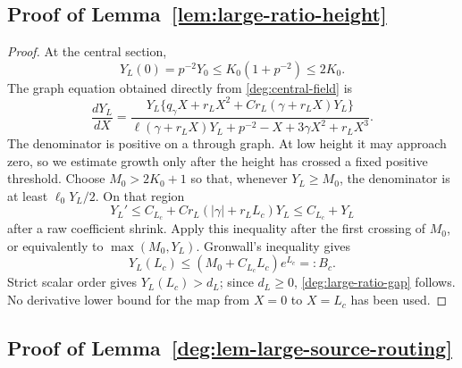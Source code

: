\subsection{Proof of Lemma~\ref{lem:large-ratio-height}}
\label{app:proof-large-ratio-height}

\begin{proof}
At the central section,
\[
 Y_L(0)=p^{-2}Y_0\le K_0(1+p^{-2})\le2K_0.
\]
The graph equation obtained directly from
\eqref{deg:central-field} is
\begin{equation}
 \frac{dY_L}{dX}=
 \frac{Y_L\{q_\gamma X+r_LX^2+
       Cr_L(\gamma+r_LX)Y_L\}}
  {\ell(\gamma+r_LX)Y_L+p^{-2}-X+3\gamma X^2+r_LX^3}.
 \label{eq:large-ratio-graph}
\end{equation}
The denominator is positive on a through graph. At low height it may
approach zero, so we estimate growth only after the height has crossed
a fixed positive threshold.  Choose \(M_0>2K_0+1\) so
that, whenever \(Y_L\ge M_0\), the denominator is at least
\(\ell_0Y_L/2\).  On that region
\[
 Y_L'\le C_{L_c}+Cr_L(|\gamma|+r_LL_c)Y_L
       \le C_{L_c}+Y_L
\]
after a raw coefficient shrink.  Apply this inequality after the first crossing of \(M_0\), or
equivalently to \(\max(M_0,Y_L)\).  Gronwall's
inequality gives
\[
 Y_L(L_c)\le(M_0+C_{L_c}L_c)e^{L_c}=:B_c.
\]
Strict scalar order gives \(Y_L(L_c)>d_L\); since \(d_L\ge0\),
\eqref{deg:large-ratio-gap} follows.  No derivative lower bound for the
map from \(X=0\) to \(X=L_c\) has been used.
\end{proof}

\subsection{Proof of Lemma~\ref{deg:lem-large-source-routing}}
\label{app:proof-large-source-routing}

